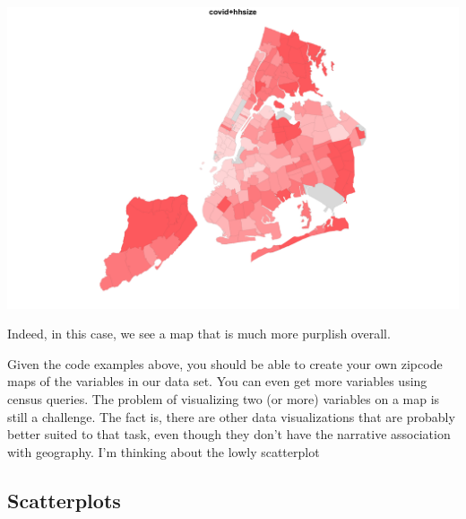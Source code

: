 \documentclass[
  openany]{book}
\newenvironment{Shaded}{\begin{snugshade}}{\end{snugshade}}
\newcommand{\AttributeTok}[1]{\textcolor[rgb]{0.77,0.63,0.00}{#1}}
\newcommand{\DecValTok}[1]{\textcolor[rgb]{0.00,0.00,0.81}{#1}}
\newcommand{\FloatTok}[1]{\textcolor[rgb]{0.00,0.00,0.81}{#1}}
\newcommand{\FunctionTok}[1]{\textcolor[rgb]{0.00,0.00,0.00}{#1}}
\newcommand{\NormalTok}[1]{#1}
\newcommand{\SpecialCharTok}[1]{\textcolor[rgb]{0.00,0.00,0.00}{#1}}
\newcommand{\StringTok}[1]{\textcolor[rgb]{0.31,0.60,0.02}{#1}}
\begin{document}
\begin{Shaded}
\end{Shaded}

\begin{center}\includegraphics[width=0.9\linewidth]{carpedatum_files/figure-html/unnamed-chunk-97-3} \end{center}

Indeed, in this case, we see a map that is much more purplish overall.

Given the code examples above, you should be able to create your own zipcode maps of the variables in our data set. You can even get more variables using census queries. The problem of visualizing two (or more) variables on a map is still a challenge. The fact is, there are other data visualizations that are probably better suited to that task, even though they don't have the narrative association with geography. I'm thinking about the lowly scatterplot

\hypertarget{scatterplots}{%
\subsection*{Scatterplots}\label{scatterplots}}
\end{document}
